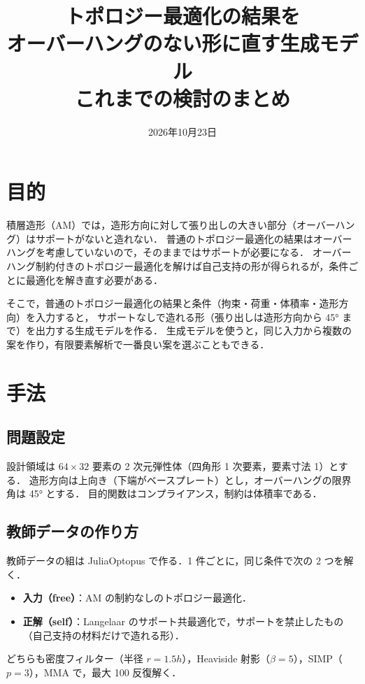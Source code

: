 \documentclass[a4paper,11pt]{ltjsarticle}
\title{トポロジー最適化の結果を\\オーバーハングのない形に直す生成モデル\\[0.4em]\large これまでの検討のまとめ}
\date{2026年10月23日}
\begin{document}
\maketitle

\section{目的}

積層造形（AM）では，造形方向に対して張り出しの大きい部分（オーバーハング）はサポートがないと造れない．
普通のトポロジー最適化の結果はオーバーハングを考慮していないので，そのままではサポートが必要になる．
オーバーハング制約付きのトポロジー最適化を解けば自己支持の形が得られるが，条件ごとに最適化を解き直す必要がある．

そこで，普通のトポロジー最適化の結果と条件（拘束・荷重・体積率・造形方向）を入力すると，
サポートなしで造れる形（張り出しは造形方向から \ang{45} まで）を出力する生成モデルを作る．
生成モデルを使うと，同じ入力から複数の案を作り，有限要素解析で一番良い案を選ぶこともできる．

\section{手法}

\subsection{問題設定}

設計領域は $64 \times 32$ 要素の 2 次元弾性体（四角形 1 次要素，要素寸法 1）とする．
造形方向は上向き（下端がベースプレート）とし，オーバーハングの限界角は \ang{45} とする．
目的関数はコンプライアンス，制約は体積率である．

\subsection{教師データの作り方}

教師データの組は JuliaOptopus で作る．1 件ごとに，同じ条件で次の 2 つを解く．
\begin{itemize}
  \item \textbf{入力（free）}：AM の制約なしのトポロジー最適化．
  \item \textbf{正解（self）}：Langelaar のサポート共最適化で，サポートを禁止したもの（自己支持の材料だけで造れる形）．
\end{itemize}
どちらも密度フィルター（半径 $r = 1.5h$），Heaviside 射影（$\beta = 5$），SIMP（$p = 3$），MMA で，最大 100 反復解く．
\end{document}
